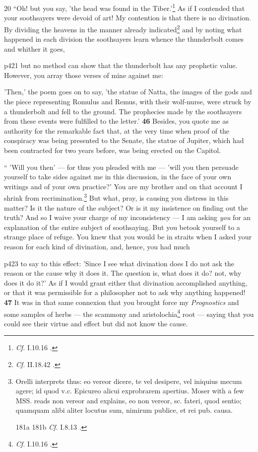 20
``Oh! but you say, 'the head was found in the Tiber.'\texthebrew{}\footnote{\emph{Cf.}
I.10.16 .

} As if I contended that your soothsayers were devoid of art! My contention is that there is no divination. By dividing the heavens in the manner already indicated\texthebrew{}\footnote{\emph{Cf.} II.18.42 .

} and by noting what happened in each division the soothsayers learn whence the thunderbolt comes and whither it goes,

p421 but no method can show that the thunderbolt has any prophetic value. However, you array those verses of mine against me:

'Then,' the poem goes on to say, 'the statue of Natta, the images of the gods and the piece representing Romulus and Remus, with their wolf-nurse, were struck by a thunderbolt and fell to the ground. The prophecies made by the soothsayers from these events were fulfilled to the letter.' \textbf{46} Besides, you quote me as authority for the remarkable fact that, at the very time when proof of the conspiracy was being presented to the Senate, the statue of Jupiter, which had been contracted for two years before, was being erected on the Capitol.

`` 'Will you then' \texthebrew{—} for thus you pleaded with me \texthebrew{—} 'will you then persuade yourself to take sides against me in this discussion, in the face of your own writings and of your own practice?' You are my brother and on that account I shrink from recrimination.\texthebrew{}\footnote{Orelli interprets thus: eo vereor dicere, te vel desipere, vel iniquius mecum agere; id quod v.c. Epicureo alicui exprobrarem apertius. Moser with a few MSS. reads non vereor and explains, eo non vereor, sc. fateri, quod sentio; quamquam alibi aliter locutus sum, nimirum publice, et rei pub. causa.



181a
181b
\emph{Cf.}
I.8.13 .

} But what, pray, is causing you distress in this matter? Is it the nature of the subject? Or is it my insistence on finding out the truth? And so I waive your charge of my inconsistency \texthebrew{—} I am asking \emph{you} for an explanation of the entire subject of soothsaying. But you betook yourself to a strange place of refuge. You knew that you would be in straits when I asked your reason for each kind of divination, and, hence, you had much

p423 to say to this effect: 'Since I see what divination does I do not ask the reason or the cause why it does it. The question is, what does it do? not, why does it do it?' As if I would grant either that divination accomplished anything, or that it was permissible for a philosopher not to ask why anything happened! \textbf{47} It was in that same connexion that you brought force my \emph{Prognostics}\texthebrew{} and some samples of herbs \texthebrew{—} the scammony and aristolochia\texthebrew{}\footnote{\emph{Cf.}
I.10.16 .

} root \texthebrew{—} saying that you could see their virtue and effect but did not know the cause.

